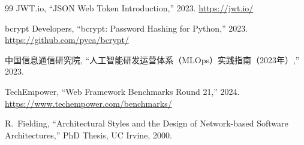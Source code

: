 \documentclass[12pt,a4paper]{ctexart}
\begin{document}
\begin{thebibliography}{99}
JWT.io, ``JSON Web Token Introduction,'' 2023. \url{https://jwt.io/}

bcrypt Developers, ``bcrypt: Password Hashing for Python,'' 2023. \url{https://github.com/pyca/bcrypt/}

中国信息通信研究院, ``人工智能研发运营体系（MLOps）实践指南（2023年）,'' 2023.

TechEmpower, ``Web Framework Benchmarks Round 21,'' 2024. \url{https://www.techempower.com/benchmarks/}

R.~Fielding, ``Architectural Styles and the Design of Network-based Software Architectures,'' PhD Thesis, UC Irvine, 2000.


\end{thebibliography}
\end{document}
